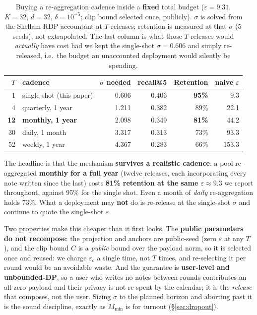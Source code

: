 \documentclass[pdflatex,sn-mathphys-num,iicol]{sn-jnl}
\theoremstyle{thmstyleone}%
\theoremstyle{thmstyletwo}%
\theoremstyle{thmstylethree}%
\newcommand{\eps}{\varepsilon}
\newcommand{\secref}[1]{\S\ref{#1}}
\begin{document}
\begin{table}[t]
  \centering
  \caption{Buying a re-aggregation cadence inside a \textbf{fixed} total budget
  ($\eps = 9.31$, $K = 32$, $d = 32$, $\delta = 10^{-5}$; clip bound selected once,
  publicly). $\sigma$ is solved from the Skellam-RDP accountant at $T$ releases;
  retention is measured at that $\sigma$ (5 seeds), not extrapolated. The last column is
  what those $T$ releases would \emph{actually} have cost had we kept the single-shot
  $\sigma = 0.606$ and simply re-released, i.e.\ the budget an unaccounted deployment
  would silently be spending.}
  \label{tab:multiround}
  \begin{tabular}{@{}rlrrrr@{}}
    \toprule
    $T$ & cadence & $\sigma$ needed & recall@5 & Retention & naive $\eps$ \\
    \midrule
    1  & single shot (this paper) & 0.606 & 0.406 & \textbf{95\%} & 9.3 \\
    4  & quarterly, 1 year        & 1.211 & 0.382 & 89\% & 22.1 \\
    \textbf{12} & \textbf{monthly, 1 year} & 2.098 & 0.349 & \textbf{81\%} & 44.2 \\
    30 & daily, 1 month           & 3.317 & 0.313 & 73\% & 93.3 \\
    52 & weekly, 1 year           & 4.367 & 0.283 & 66\% & 153.3 \\
    \bottomrule
  \end{tabular}
\end{table}

The headline is that the mechanism \textbf{survives a realistic cadence}: a pool
re-aggregated \textbf{monthly for a full year} (twelve releases, each incorporating
every note written since the last) costs \textbf{81\% retention at the same
$\eps \approx 9.3$} we report throughout, against 95\% for the single shot. Even a
month of \emph{daily} re-aggregation holds 73\%. What a deployment may \textbf{not} do
is re-release at the single-shot $\sigma$ and continue to quote the single-shot $\eps$.

Two properties make this cheaper than it first looks. The \textbf{public parameters do
not recompose}: the projection and anchors are public-seed (zero $\eps$ at any $T$), and
the clip bound $C$ is a \emph{public} bound over the payload norm, so it is selected once
and reused: we charge $\eps_c$ a single time, not $T$ times, and re-selecting it per
round would be an avoidable waste. And the guarantee is \textbf{user-level and
unbounded-DP}, so a user who writes no notes between rounds contributes an all-zero
payload and their privacy is not re-spent by the calendar; it is the \emph{release} that
composes, not the user. Sizing $\sigma$ to the planned horizon and aborting past it is
the sound discipline, exactly as $M_{\min}$ is for turnout (\secref{sec:dropout}).
\end{document}
